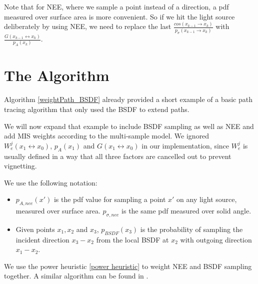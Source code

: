 Note that for NEE, where we sample a point instead of a direction, a pdf measured over surface area is more convenient. So if we hit the light source deliberately by using NEE, we need to replace the last $\frac{cos(x_{k-1} \rightarrow x_k)}{p_\sigma(x_{k-1} \rightarrow x_k)}$ with $\frac{G(x_{k-1} \leftrightarrow x_k)}{p_A(x_k)}$.

\newpage
\section{The Algorithm}
\label{pathtracingalgorithm}

Algorithm \ref{weightPath_BSDF} already provided a short example of a basic path tracing algorithm that only used the BSDF to extend paths.

We will now expand that example to include BSDF sampling as well as NEE and add MIS weights according to the multi-sample model. We ignored $W_e^j(x_1 \leftrightarrow x_0)$, $p_A(x_1)$ and $G(x_1 \leftrightarrow x_0)$ in our implementation, since $W_e^j$ is usually defined in a way that all three factors are cancelled out to prevent vignetting.

We use the following notation:
\begin{itemize}
\item $p_{A,nee}(x')$ is the pdf value for sampling a point $x'$ on any light source, measured over surface area. $p_{\sigma,nee}$ is the same pdf measured over solid angle.
\item Given points $x_1, x_2$ and $x_3$, $p_{BSDF}(x_3)$ is the probability of sampling the incident direction $x_3 - x_2$ from the local BSDF at $x_2$ with outgoing direction $x_1 - x_2$.
\end{itemize}
We use the power heuristic \ref{power heuristic} to weight NEE and BSDF sampling together. A similar algorithm can be found in \cite{survey}. 

